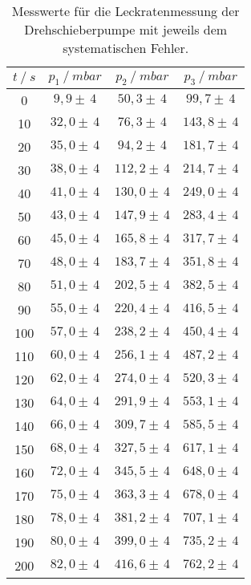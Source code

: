 \begin{table}[H]
  \centering
  \begin{tabular}{c|c|c|c}
    {$t \:/\: \si{s}$} & {$p_1 \:/\: \si{mbar} $} & {$p_2 \:/\: \si{mbar} $} & {$p_3 \:/\: \si{mbar} $}\\
  \midrule
  0     & $ 9,9   \pm \,  4 $ & $ 50,3   \pm \,  4 $ & $ 99,7   \pm \,  4 $ \\ 
  10    & $ 32,0  \pm \,  4 $ & $ 76,3   \pm \,  4 $ & $ 143,8  \pm \,  4 $ \\
  20    & $ 35,0  \pm \,  4 $ & $ 94,2   \pm \,  4 $ & $ 181,7  \pm \,  4 $ \\
  30    & $ 38,0  \pm \,  4 $ & $ 112,2  \pm \,  4 $ & $ 214,7  \pm \,  4 $ \\
  40    & $ 41,0  \pm \,  4 $ & $ 130,0  \pm \,  4 $ & $ 249,0  \pm \,  4 $ \\
  50    & $ 43,0  \pm \,  4 $ & $ 147,9  \pm \,  4 $ & $ 283,4  \pm \,  4 $ \\
  60    & $ 45,0  \pm \,  4 $ & $ 165,8  \pm \,  4 $ & $ 317,7  \pm \,  4 $ \\
  70    & $ 48,0  \pm \,  4 $ & $ 183,7  \pm \,  4 $ & $ 351,8  \pm \,  4 $ \\
  80    & $ 51,0  \pm \,  4 $ & $ 202,5  \pm \,  4 $ & $ 382,5  \pm \,  4 $ \\
  90    & $ 55,0  \pm \,  4 $ & $ 220,4  \pm \,  4 $ & $ 416,5  \pm \,  4 $ \\
  100   & $ 57,0  \pm \,  4 $ & $ 238,2  \pm \,  4 $ & $ 450,4  \pm \,  4 $ \\
  110   & $ 60,0  \pm \,  4 $ & $ 256,1  \pm \,  4 $ & $ 487,2  \pm \,  4 $ \\
  120   & $ 62,0  \pm \,  4 $ & $ 274,0  \pm \,  4 $ & $ 520,3  \pm \,  4 $ \\
  130   & $ 64,0  \pm \,  4 $ & $ 291,9  \pm \,  4 $ & $ 553,1  \pm \,  4 $ \\
  140   & $ 66,0  \pm \,  4 $ & $ 309,7  \pm \,  4 $ & $ 585,5  \pm \,  4 $ \\
  150   & $ 68,0  \pm \,  4 $ & $ 327,5  \pm \,  4 $ & $ 617,1  \pm \,  4 $ \\
  160   & $ 72,0  \pm \,  4 $ & $ 345,5  \pm \,  4 $ & $ 648,0  \pm \,  4 $ \\
  170   & $ 75,0  \pm \,  4 $ & $ 363,3  \pm \,  4 $ & $ 678,0  \pm \,  4 $ \\
  180   & $ 78,0  \pm \,  4 $ & $ 381,2  \pm \,  4 $ & $ 707,1  \pm \,  4 $ \\
  190   & $ 80,0  \pm \,  4 $ & $ 399,0  \pm \,  4 $ & $ 735,2  \pm \,  4 $ \\
  200   & $ 82,0  \pm \,  4 $ & $ 416,6  \pm \,  4 $ & $ 762,2  \pm \,  4 $ \\
  \end{tabular}
  \caption{Messwerte für die Leckratenmessung der Drehschieberpumpe mit jeweils dem systematischen Fehler.}
  \label{tab:drehleck2}
\end{table}

